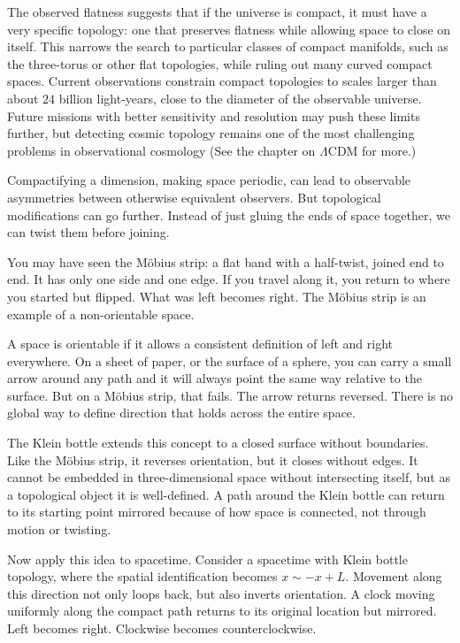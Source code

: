 The observed flatness suggests that if the universe is compact, it must have a very specific topology: one that preserves flatness while allowing space to close on itself. This narrows the search to particular classes of compact manifolds, such as the three-torus or other flat topologies, while ruling out many curved compact spaces. Current observations constrain compact topologies to scales larger than about $24$ billion light-years, close to the diameter of the observable universe. Future missions with better sensitivity and resolution may push these limits further, but detecting cosmic topology remains one of the most challenging problems in observational cosmology (See the chapter on $\Lambda$CDM for more.)

Compactifying a dimension, making space periodic, can lead to observable asymmetries between otherwise equivalent observers. But topological modifications can go further. Instead of just gluing the ends of space together, we can twist them before joining.

You may have seen the Möbius strip: a flat band with a half-twist, joined end to end. It has only one side and one edge. If you travel along it, you return to where you started but flipped. What was left becomes right. The Möbius strip is an example of a non-orientable space.

A space is orientable if it allows a consistent definition of left and right everywhere. On a sheet of paper, or the surface of a sphere, you can carry a small arrow around any path and it will always point the same way relative to the surface. But on a Möbius strip, that fails. The arrow returns reversed. There is no global way to define direction that holds across the entire space.

The Klein bottle extends this concept to a closed surface without boundaries. Like the Möbius strip, it reverses orientation, but it closes without edges. It cannot be embedded in three-dimensional space without intersecting itself, but as a topological object it is well-defined. A path around the Klein bottle can return to its starting point mirrored because of how space is connected, not through motion or twisting.

Now apply this idea to spacetime. Consider a spacetime with Klein bottle topology, where the spatial identification becomes $x \sim -x + L$. Movement along this direction not only loops back, but also inverts orientation. A clock moving uniformly along the compact path returns to its original location but mirrored. Left becomes right. Clockwise becomes counterclockwise.

